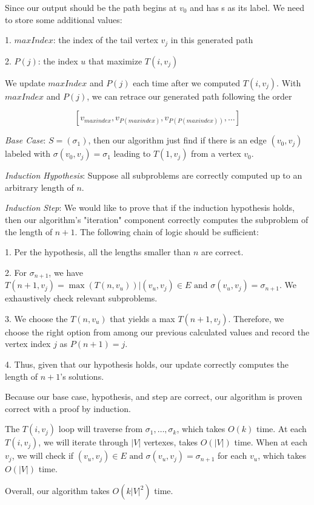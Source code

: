 Since our output should be the path begins at $v_0$ and has s as its label. We need to store some additional values:

1. $maxIndex$: the index of the tail vertex $v_j$ in this generated path

2. $P(j)$: the index $u$ that maximize $T(i, v_j)$

We update $maxIndex$ and $P(j)$ each time after we computed $T(i, v_j)$. With $maxIndex$ and $P(j)$, we can retrace our generated path following the order

$$[v_{maxindex}, v_{P(maxindex)}, v_{P(P(maxindex))}, \dots]$$



\textit{Base Case}: $S=(\sigma_1)$, then our algorithm just find if there is an edge $(v_0, v_j)$ labeled with $\sigma(v_0, v_j)=\sigma_1$ leading to $T(1, v_j)$ from a vertex $v_0$.

\textit{Induction Hypothesis}: Suppose all subproblems are correctly computed up to an arbitrary length of $n$.

\textit{Induction Step}: We would like to prove that if the induction hypothesis holds, then our algorithm's "iteration" component correctly computes the subproblem of the length of $n+1$. The following chain of logic should be sufficient:

1. Per the hypothesis, all the lengths smaller than $n$ are correct.

2. For $\sigma_{n+1}$, we have $T(n+1, v_j) = \max(T(n, v_u)) |(v_u, v_j) \in E \text { and } \sigma(v_u, v_j)=\sigma_{n+1}$. We exhaustively check relevant subproblems.

3. We choose the $T(n, v_u)$ that yields a max $T(n+1, v_j)$. Therefore, we choose the right option from among our previous calculated values and record the vertex index $j$ as $P(n+1)=j$.

4. Thus, given that our hypothesis holds, our update correctly computes the length of $n+1$'s solutions.

Because our base case, hypothesis, and step are correct, our algorithm is proven correct with a proof by induction.



The $T(i, v_j)$ loop will traverse from $\sigma_1, \dots, \sigma_k$, which takes $O(k)$ time. At each $T(i, v_j)$, we will iterate through $|V|$ vertexes, takes $O(|V|)$ time. When at each $v_j$, we will check if $(v_u, v_j) \in E \text { and } \sigma(v_u, v_j)=\sigma_{n+1}$ for each $v_u$, which takes $O(|V|)$ time.

Overall, our algorithm takes $O(k |V|^2)$ time.




